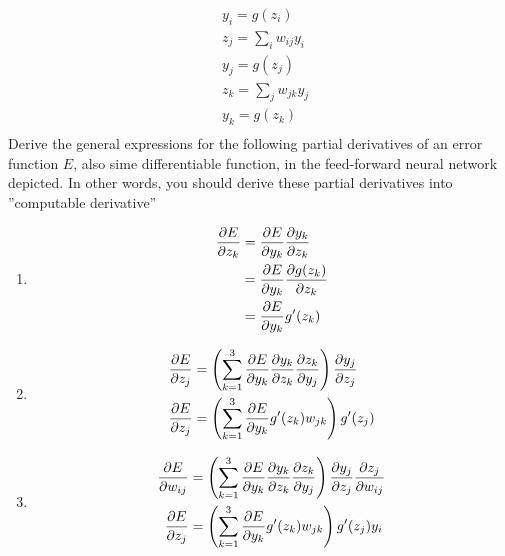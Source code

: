 \documentclass[12pt, a4paper]{article}
\begin{document}
\begin{enumerate}
\begin{align*}
    &y_i = g(z_i)\\
    &z_j = \sum\limits_i w_{ij}y_i\\
    &y_j = g(z_j)\\
    &z_k = \sum\limits_j w_{jk}y_j\\
    &y_k = g(z_k)\\
\end{align*}
Derive the general expressions for the following partial derivatives of an error function $E$, also sime differentiable function, in the feed-forward neural network depicted. In other words, you should derive these partial derivatives into ”computable derivative”
\begin{enumerate}
    \item \begin{align*}
        \pdv{E}{z_k} &= \pdv{E}{y_k}\pdv{y_k}{z_k}\\
        &= \pdv{E}{y_k}\pdv{g(z_k)}{z_k}\\
        &= \pdv{E}{y_k}g'(z_k)\\
    \end{align*}
    \item \begin{align*}
        \pdv{E}{z_j} &= \left(\sum\limits_{k=1}^3\pdv{E}{y_k}\pdv{y_k}{z_k}\pdv{z_k}{y_j}\right)\pdv{y_j}{z_j}\\
        \pdv{E}{z_j} &= \left(\sum\limits_{k=1}^3\pdv{E}{y_k}g'(z_k)w_{jk}\right)g'(z_j)\\
    \end{align*}
    \item \begin{align*}
        \pdv{E}{w_{ij}} &= \left(\sum\limits_{k=1}^3\pdv{E}{y_k}\pdv{y_k}{z_k}\pdv{z_k}{y_j}\right)\pdv{y_j}{z_j}\pdv{z_j}{w_{ij}}\\
        \pdv{E}{z_j} &= \left(\sum\limits_{k=1}^3\pdv{E}{y_k}g'(z_k)w_{jk}\right)g'(z_j)y_i\\
    \end{align*}
\end{enumerate}
\end{enumerate}
\end{document}
